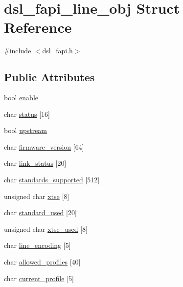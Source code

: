 \hypertarget{structdsl__fapi__line__obj}{\section{dsl\-\_\-fapi\-\_\-line\-\_\-obj Struct Reference}
\label{structdsl__fapi__line__obj}
}


{\ttfamily \#include $<$dsl\-\_\-fapi.\-h$>$}

\subsection*{Public Attributes}
\begin{DoxyCompactItemize}
\item 
bool \hyperlink{structdsl__fapi__line__obj_a1df3e86a3e373ccb8088d7512fe4ca2d}{enable}
\item 
char \hyperlink{structdsl__fapi__line__obj_ac7cdd7ccd0685ff5b39a134416eb3dec}{status} \mbox{[}16\mbox{]}
\item 
bool \hyperlink{structdsl__fapi__line__obj_abbf14e370be31a02b4d46c2e0bafba17}{upstream}
\item 
char \hyperlink{structdsl__fapi__line__obj_a8af792db1176f3c9644c38306f881f4f}{firmware\-\_\-version} \mbox{[}64\mbox{]}
\item 
char \hyperlink{structdsl__fapi__line__obj_a0aafbe991c821849398cef04fe2c01aa}{link\-\_\-status} \mbox{[}20\mbox{]}
\item 
char \hyperlink{structdsl__fapi__line__obj_abc227e8ac4ba23bb87f65e9099dc0f65}{standards\-\_\-supported} \mbox{[}512\mbox{]}
\item 
unsigned char \hyperlink{structdsl__fapi__line__obj_af8a2b118576e853690ab301ce3d05c63}{xtse} \mbox{[}8\mbox{]}
\item 
char \hyperlink{structdsl__fapi__line__obj_a264efe2323db92c69fe2b7d3213918c3}{standard\-\_\-used} \mbox{[}20\mbox{]}
\item 
unsigned char \hyperlink{structdsl__fapi__line__obj_ac3b19b16fda0753232eef0d9c9fcb624}{xtse\-\_\-used} \mbox{[}8\mbox{]}
\item 
char \hyperlink{structdsl__fapi__line__obj_a7149428e5bd71db580fb32510c8636a1}{line\-\_\-encoding} \mbox{[}5\mbox{]}
\item 
char \hyperlink{structdsl__fapi__line__obj_a59c5f2224ed0757a95e6ebde1d37e560}{allowed\-\_\-profiles} \mbox{[}40\mbox{]}
\item 
char \hyperlink{structdsl__fapi__line__obj_a6561ecbfe02e86e5bd2c3ff382bfbd48}{current\-\_\-profile} \mbox{[}5\mbox{]}

\end{DoxyCompactItemize}
